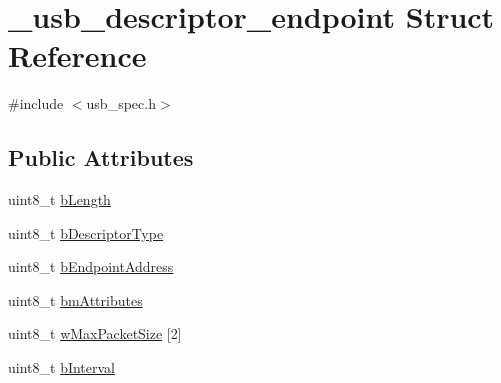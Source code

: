 \hypertarget{struct__usb__descriptor__endpoint}{\section{\-\_\-usb\-\_\-descriptor\-\_\-endpoint Struct Reference}
\label{struct__usb__descriptor__endpoint}
}


{\ttfamily \#include $<$usb\-\_\-spec.\-h$>$}

\subsection*{Public Attributes}
\begin{DoxyCompactItemize}
\item 
uint8\-\_\-t \hyperlink{struct__usb__descriptor__endpoint_ab891639a51492967253ac77dafbbaa44}{b\-Length}
\item 
uint8\-\_\-t \hyperlink{struct__usb__descriptor__endpoint_a3bfe14127ca7aea1148d634f09ac38cf}{b\-Descriptor\-Type}
\item 
uint8\-\_\-t \hyperlink{struct__usb__descriptor__endpoint_ae40644f7137b84d98de220ddbffed779}{b\-Endpoint\-Address}
\item 
uint8\-\_\-t \hyperlink{struct__usb__descriptor__endpoint_a6042f7ae567104f4a0ecc2a173b70b75}{bm\-Attributes}
\item 
uint8\-\_\-t \hyperlink{struct__usb__descriptor__endpoint_a4d4bc99844ec977a7285551bed4d541e}{w\-Max\-Packet\-Size} \mbox{[}2\mbox{]}
\item 
uint8\-\_\-t \hyperlink{struct__usb__descriptor__endpoint_a9b162ee9a2ae7222734ea3b9cc17cb71}{b\-Interval}
\end{DoxyCompactItemize}



